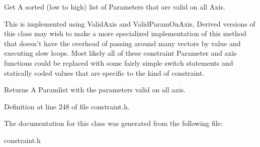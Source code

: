 Get A sorted (low to high) list of Parameters that are valid on all Axis. 

This is implemented using ValidAxis and ValidParamOnAxis, Derived versions of this class may wish to make a more specialized implementation of this method that doesn't have the overhead of passing around many vectors by value and executing slow loops. Most likely all of these constraint Parameter and axis functions could be replaced with some fairly simple switch statements and statically coded values that are specific to the kind of constraint. \begin{DoxyReturn}{Returns}
A Paramlist with the parameters valid on all axis. 
\end{DoxyReturn}


Definition at line 248 of file constraint.h.



The documentation for this class was generated from the following file:\begin{DoxyCompactItemize}
\item 
constraint.h\end{DoxyCompactItemize}
